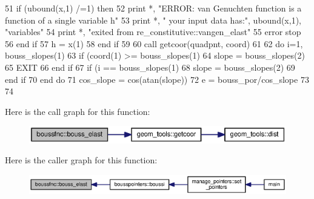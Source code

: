 \begin{DoxyCode}
51           \textcolor{keywordflow}{if} (ubound(x,1) /=1) \textcolor{keywordflow}{then}
52             print *, \textcolor{stringliteral}{"ERROR: van Genuchten function is a function of a single variable h"}
53             print *, \textcolor{stringliteral}{"       your input data has:"}, ubound(x,1), \textcolor{stringliteral}{"variables"}
54             print *, \textcolor{stringliteral}{"exited from re\_constitutive::vangen\_elast"}
55             error stop
56 \textcolor{keywordflow}{          end if}
57           h = x(1)
58 \textcolor{keywordflow}{        end if}
59 
60         \textcolor{keyword}{call }getcoor(quadpnt, coord)
61         
62         \textcolor{keywordflow}{do} i=1, bouss_slopes(1)%
63           \textcolor{keywordflow}{if} (coord(1) >= bouss_slopes(1)%
64             slope = bouss_slopes(2)%
65             \textcolor{keywordflow}{EXIT}
66 \textcolor{keywordflow}{          end if}
67           \textcolor{keywordflow}{if} (i == bouss_slopes(1)%
68             slope = bouss_slopes(2)%
69 \textcolor{keywordflow}{          end if}
70 \textcolor{keywordflow}{        end do}
71         cos\_slope = cos(atan(slope))
72         e = bouss_por/cos\_slope 
73         
74 
\end{DoxyCode}


Here is the call graph for this function\+:\nopagebreak
\begin{figure}[H]
\begin{center}
\leavevmode
\includegraphics[width=350pt]{namespaceboussfnc_a071d2eeb5f983e31d4495bb68a137e76_cgraph}
\end{center}
\end{figure}




Here is the caller graph for this function\+:\nopagebreak
\begin{figure}[H]
\begin{center}
\leavevmode
\includegraphics[width=350pt]{namespaceboussfnc_a071d2eeb5f983e31d4495bb68a137e76_icgraph}
\end{center}
\end{figure}



